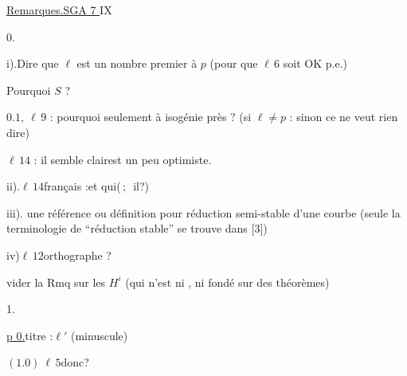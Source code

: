 
\uline{Remarques.\qquad SGA 7 $\boxed{\mathrm{IX}}$}

0.

i).\quad Dire que $\ell$ est un nombre premier à $p$ (pour que $\ell\,6$ soit OK p.e.)

Pourquoi $S$  ?

$0.1,\ \ell\,9$ : pourquoi seulement à isogénie près ? (si $\ell\ne p$ : sinon ce ne veut rien dire)

$\ell\,14$ : il semble clair\qquad est un peu optimiste.

ii).\quad $\ell\,14$\quad français :\qquad et qui\qquad ($\,;\,$ il\quad ?)

iii).\quad
{}
une référence ou définition pour réduction semi-stable d'une courbe (seule la terminologie de ``réduction stable'' se trouve dans [3])

iv)\quad $\ell\,12$\quad orthographe ?\qquad {}

vider la Rmq sur les $H^i$ (qui n'est ni
, ni fondé sur des théorèmes)


1.

\uline{p 0.}\quad titre :\qquad $\ell'$ (minuscule)

$(1.0)\ \ell\,5$\qquad donc\qquad ?

